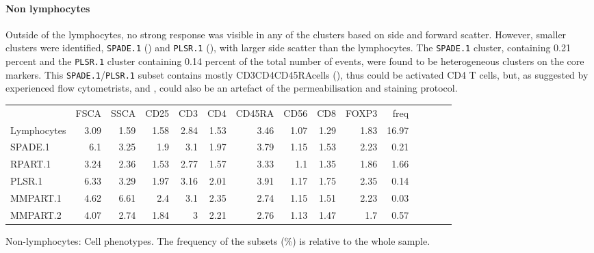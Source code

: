 
\clearpage


\paragraph{Non lymphocytes}
Outside of the lymphocytes, no strong response was visible in any of the clusters based on side and forward scatter.
However, smaller clusters were identified, \texttt{SPADE.1} () and \texttt{PLSR.1} (), with larger side scatter than the lymphocytes.
The \texttt{SPADE.1} cluster, containing 0.21 percent and the \texttt{PLSR.1} cluster containing 0.14 percent of the total number of events, were found to be heterogeneous clusters on the core markers.
This \texttt{SPADE.1}/\texttt{PLSR.1} subset contains mostly CD3\positive CD4\positive CD45RA\positive cells (), thus could be activated CD4 T cells, but, as suggested by experienced flow cytometrists,  and , could also be an artefact of the permeabilisation and staining protocol.


\begin{table}[h]\footnotesize
\centering
\begin{tabular}{lrrrrrrrrrrrrrr}
\rowcolor{Gray} 
            & FSCA & SSCA & CD25 & CD3  & CD4  & CD45RA & CD56 & CD8  & FOXP3 & freq \\
Lymphocytes & 3.09 & 1.59 & 1.58 & 2.84 & 1.53 & 3.46   & 1.07 & 1.29 & 1.83  & 16.97 \\
SPADE.1     & 6.1  & 3.25 & 1.9  & 3.1  & 1.97 & 3.79   & 1.15 & 1.53 & 2.23  & 0.21 \\
RPART.1     & 3.24 & 2.36 & 1.53 & 2.77 & 1.57 & 3.33   & 1.1  & 1.35 & 1.86  & 1.66 \\
PLSR.1      & 6.33 & 3.29 & 1.97 & 3.16 & 2.01 & 3.91   & 1.17 & 1.75 & 2.35  & 0.14 \\
MMPART.1    & 4.62 & 6.61 & 2.4  & 3.1  & 2.35 & 2.74   & 1.15 & 1.51 & 2.23  & 0.03 \\
MMPART.2    & 4.07 & 2.74 & 1.84 & 3    & 2.21 & 2.76   & 1.13 & 1.47 & 1.7   & 0.57 \\
\end{tabular}
{ Non-lymphocytes: Cell phenotypes. }
{ The frequency of the subsets (\%) is relative to the whole sample. }
\end{table}


